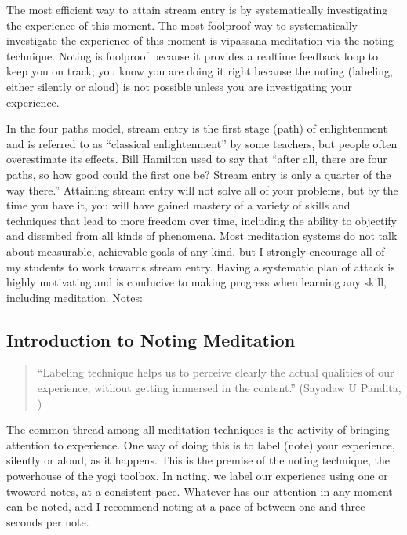 \documentclass[a5paper,10pt,english]{book}
\begin{document}
\sphinxAtStartPar
The most efficient way to attain stream entry is by systematically
investigating the experience of this moment. The most foolproof way to
systematically investigate the experience of this moment is vipassana
meditation via the noting technique. Noting is foolproof because it
provides a real\sphinxhyphen{}time feedback loop to keep you on track; you know you
are doing it right because the noting (labeling, either silently or
aloud) is not possible unless you are investigating your experience.

\sphinxAtStartPar
In the four paths model, stream entry is the first stage (path) of
enlightenment and is referred to as “classical enlightenment” by some
teachers, but people often overestimate its effects. Bill Hamilton used
to say that “after all, there are four paths, so how good could the
first one be? Stream entry is only a quarter of the way there.”
Attaining stream entry will not solve all of your problems, but by the
time you have it, you will have gained mastery of a variety of skills
and techniques that lead to more freedom over time, including the
ability to objectify and dis\sphinxhyphen{}embed from all kinds of phenomena. Most
meditation systems do not talk about measurable, achievable goals of any
kind, but I strongly encourage all of my students to work towards stream
entry. Having a systematic plan of attack is highly motivating and is
conducive to making progress when learning any skill, including
meditation. Notes:


\subsection{Introduction to Noting Meditation}
\label{\detokenize{main-3:introduction-to-noting-meditation}}\begin{quote}

\sphinxAtStartPar
“Labeling technique helps us to perceive clearly the actual
qualities of our experience, without getting immersed in the
content.” (Sayadaw U Pandita, )
\end{quote}

\sphinxAtStartPar
The common thread among all meditation techniques is the activity of
bringing attention to experience. One way of doing this is to label
(note) your experience, silently or aloud, as it happens. This is the
premise of the noting technique, the powerhouse of the yogi toolbox. In
noting, we label our experience using one or two\sphinxhyphen{}word notes, at a
consistent pace. Whatever has our attention in any moment can be noted,
and I recommend noting at a pace of between one and three seconds per
note.
\end{document}
